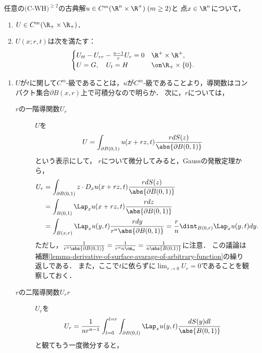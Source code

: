 \documentclass[uplatex,dvipdfmx]{jsreport}
\begin{document}
\begin{lemma}\label{lemma-Euler-Poisson-Darboux}
    任意の$\text{(C-WH)}^{\ge2}$の古典解$u\in C^m(\R^n\times\R^+)\;(m\ge2)$と
    点$x\in\R^n$について，
    \begin{enumerate}
        \item $U\in C^m(\R_+\times\R_+)$．
        \item $U(x;r,t)$は次を満たす：
        \[\begin{cases}
            U_{tt}-U_{rr}-\frac{n-1}{r}U_{r}=0&\R^+\times\R^+,\\
            U=G,\quad U_t=H&\on\R_+\times\{0\}.
        \end{cases}\]
    \end{enumerate}
\end{lemma}
\begin{Proof}\mbox{}
    \begin{enumerate}
        \item $U$が$t$に関して$C^m$-級であることは，$u$が$C^m$-級であることより，導関数はコンパクト集合$\partial B(x,r)$上で可積分なので明らか．
        次に，$r$については，
        \begin{description}
            \item[$r$の一階導関数$U_r$] $U$を
            \[U=\int_{\partial B(0,1)}u(x+rz,t)\frac{rdS(z)}{\abs{\partial B(0,1)}}\]
            という表示にして，
            $r$について微分してみると，Gaussの発散定理から，
            \begin{align*}
                U_r&=\int_{\partial B(0,1)}z\cdot D_xu(x+rz,t)\frac{rdS(z)}{\abs{\partial B(0,1)}}\\
                &=\int_{B(0,1)}\Lap_xu(x+rz,t)\frac{rdz}{\abs{\partial B(0,1)}}\\
                &=\int_{B(x,r)}\Lap_xu(y,t)\frac{rdy}{r^n\abs{\partial B(0,1)}}=\frac{r}{n}\dint_{B(0,r)}\Lap_xu(y,t)dy.
            \end{align*}
            ただし，$\frac{1}{r^n\abs{\partial B(0,1)}}=\frac{1}{r^nn\om_n}=\frac{1}{n\abs{B(0,1)}}$に注意．
            この議論は補題\ref{lemma-derivative-of-surface-avarage-of-arbitrary-function}の繰り返しである．
            また，ここで$t$に依らずに$\lim_{r\to0}U_r=0$であることを観察しておく．
            \item[$r$の二階導関数$U_rr$] $U_r$を
            \[U_r=\frac{1}{nr^{n-1}}\int^{l=r}_{l=0}\int_{\partial B(0,l)}\Lap_xu(y,t)\frac{dS(y)dl}{\abs{B(0,1)}}\]
            と観てもう一度微分すると，
            \begin{align*}

\end{align*}
\end{description}
\end{enumerate}
\end{Proof}
\end{document}
